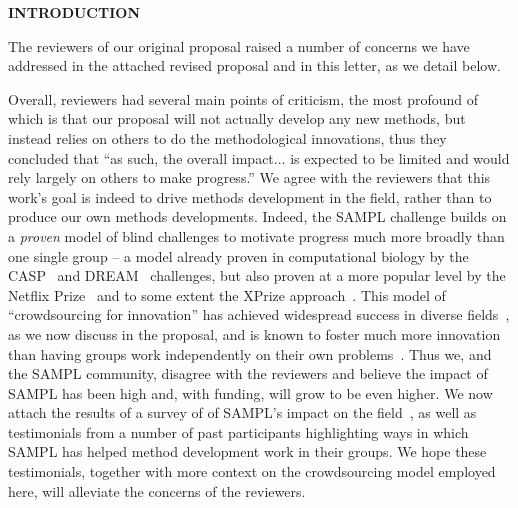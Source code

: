 \documentclass[11pt]{article}
\begin{document}



\begin{centering}
{\bf INTRODUCTION}
\end{centering}

The reviewers of our original proposal raised a number of concerns we have addressed in the attached revised proposal and in this letter, as we detail below.

Overall, reviewers had several main points of criticism, the most profound of which is that our proposal will not actually develop any new methods, but instead relies on others to do the methodological innovations, thus they concluded that ``as such, the overall impact... is expected to be limited and would rely largely on others to make progress.''
We agree with the reviewers that this work's goal is indeed to drive methods development in the field, rather than to produce our own methods developments.
Indeed, the SAMPL challenge builds on a \emph{proven} model of blind challenges to motivate progress much more broadly than one single group -- a model already proven in computational biology by the CASP~\cite{Moult:2014:Proteins, Monastyrskyy:2016:Proteins, Moult:2016:Proteins} and DREAM~\cite{Prill:2011:Sci.Signal., Eisenstein:2013:NatBiotech, Saez-Rodriguez:2016:NatRevGenet} challenges, but also proven at a more popular level by the Netflix Prize~\cite{Bell:2010:CHANCE} and to some extent the XPrize approach~\cite{::XPRIZE, Kay:2011:R&DManage, XPrize:2017:Wikipedia}. 
This model of ``crowdsourcing for innovation'' has achieved widespread success in diverse fields~\cite{Kay:2011:R&DManage, Saez-Rodriguez:2016:NatRevGenet}, as we now discuss in the proposal, and is known to foster much more innovation than having groups work independently on their own problems~\cite{Bell:2010:CHANCE, Kay:2011:R&DManage, Saez-Rodriguez:2016:NatRevGenet}.
Thus we, and the SAMPL community, disagree with the reviewers and believe the impact of SAMPL has been high and, with funding, will grow to be even higher. 
We now attach the results of a survey of of SAMPL's impact on the field~\cite{Mobley:2017:eScholarship}, as well as testimonials from a number of past participants highlighting ways in which SAMPL has helped method development work in their groups.
We hope these testimonials, together with more context on the crowdsourcing model employed here, will alleviate the concerns of the reviewers. 
\end{document}
